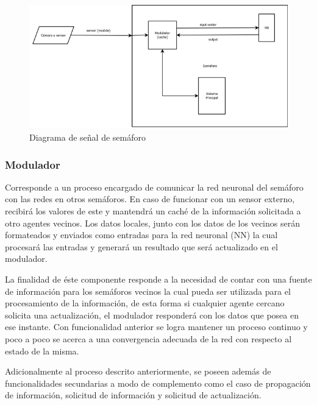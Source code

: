 \begin{figure}[htp]
\centering
\includegraphics[scale=0.9]{images/light.png}
\caption{Diagrama de se\~{n}al de sem\'{a}foro}
\label{fig:light}
\end{figure}



\subsubsection{Modulador}

Corresponde a un proceso encargado de comunicar la red neuronal del sem\'{a}foro con las redes en otros sem\'{a}foros. En caso de funcionar con un sensor externo, recibir\'{a} los valores de este y mantendr\'{a} un cach\'{e} de la informaci\'{o}n solicitada a otro agentes vecinos. Los datos locales, junto con los datos de los vecinos ser\'{a}n formateados y enviados como entradas para la red neuronal (NN) la cual procesar\'{a} las entradas y generar\'{a} un resultado que ser\'{a} actualizado en el modulador.

La finalidad de \'{e}ste componente responde a la necesidad de contar con una fuente de informaci\'{o}n para los sem\'{a}foros vecinos la cual pueda ser utilizada para el procesamiento de la informaci\'{o}n, de esta forma si cualquier agente cercano solicita una actualizaci\'{o}n, el modulador responder\'{a} con los datos que posea en ese instante. Con funcionalidad anterior se logra mantener un proceso continuo y poco a poco se acerca a una convergencia adecuada de la red con respecto al estado de la misma.

Adicionalmente al proceso descrito anteriormente, se poseen adem\'{a}s de funcionalidades secundarias a modo de complemento como el caso de propagaci\'{o}n de informaci\'{o}n, solicitud de informaci\'{o}n y solicitud de actualizaci\'{o}n.

